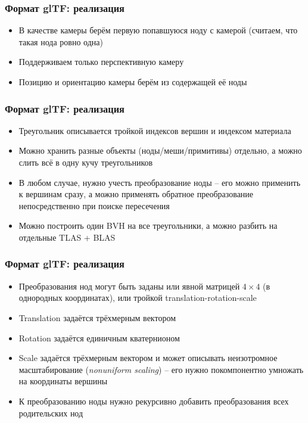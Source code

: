 \documentclass[10pt]{beamer}
\begin{document}
\begin{frame}
\frametitle{Формат glTF: реализация}
\begin{itemize}
\item В качестве камеры берём первую попавшуюся ноду с камерой (считаем, что такая нода ровно одна)
\pause
\item Поддерживаем только перспективную камеру
\pause
\item Позицию и ориентацию камеры берём из содержащей её ноды
\end{itemize}
\end{frame}

\begin{frame}
\frametitle{Формат glTF: реализация}
\begin{itemize}
\item Треугольник описывается тройкой индексов вершин и индексом материала
\pause
\item Можно хранить разные объекты (ноды/меши/примитивы) отдельно, а можно слить всё в одну кучу треугольников
\pause
\item В любом случае, нужно учесть преобразование ноды -- его можно применить к вершинам сразу, а можно применять обратное преобразование непосредственно при поиске пересечения
\pause
\item Можно построить один BVH на все треугольники, а можно разбить на отдельные TLAS + BLAS
\end{itemize}
\end{frame}

\begin{frame}
\frametitle{Формат glTF: реализация}
\begin{itemize}
\item Преобразования нод могут быть заданы или явной матрицей \begin{math}4\times 4\end{math} (в однородных координатах), или тройкой translation-rotation-scale
\pause
\item Translation задаётся трёхмерным вектором
\pause
\item Rotation задаётся единичным кватернионом
\pause
\item Scale задаётся трёхмерным вектором и может описывать неизотромное масштабирование (\textit{nonuniform scaling}) -- его нужно покомпонентно умножать на координаты вершины
\pause
\item К преобразованию ноды нужно рекурсивно добавить преобразования всех родительских нод
\end{itemize}
\end{frame}
\end{document}
